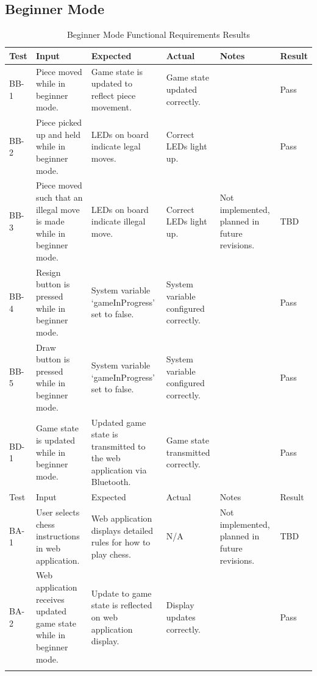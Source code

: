 \documentclass[12pt, titlepage]{article}
\begin{document}
\pagebreak

\subsection{Beginner Mode}
    \begin{longtable}{| >{\centering\arraybackslash}m{1cm} | 
        >{\centering\arraybackslash}m{2.5cm} | 
        >{\centering\arraybackslash}m{4cm} | 
        >{\centering\arraybackslash}m{3cm} |
        >{\centering\arraybackslash}m{3cm} |
        >{\centering\arraybackslash}m{1.5cm} |}
    \hline
    \rowcolor[gray]{0.9}
    Test & Input & Expected & Actual & Notes & Result\\
    \hline
    BB-1 & Piece moved while in beginner mode. & Game state is updated to reflect piece movement. & Game state updated correctly. &  & Pass \\
    \hline
    BB-2 & Piece picked up and held while in beginner mode. & LEDs on board indicate legal moves. & Correct LEDs light up. &  & Pass \\
    \hline
    BB-3 & Piece moved such that an illegal move is made while in beginner mode. & LEDs on board indicate illegal move. & Correct LEDs light up. & Not implemented, planned in future revisions. & TBD \\
    \hline
    BB-4 & Resign button is pressed while in beginner mode. & System variable `gameInProgress' set to false. & System variable configured correctly. &  & Pass \\
    \hline
    BB-5 & Draw button is pressed while in beginner mode. & System variable `gameInProgress' set to false. & System variable configured correctly. &  & Pass \\
    \hline
    BD-1 & Game state is updated while in beginner mode. & Updated game state is transmitted to the web application via Bluetooth. & Game state transmitted correctly. &  & Pass \\
    \hline
    \pagebreak 
    \hline
    \rowcolor[gray]{0.9}
    Test & Input & Expected & Actual & Notes & Result\\
    \hline
    BA-1 & User selects chess instructions in web application. & Web application displays detailed rules for how to play chess. & N/A & Not implemented, planned in future revisions. & TBD \\
    \hline
    BA-2 & Web application receives updated game state while in beginner mode. & Update to game state is reflected on web application display. & Display updates correctly. &  & Pass \\
    \hline
    \caption{Beginner Mode Functional Requirements Results}\\
\end{longtable}
    
\end{document}
